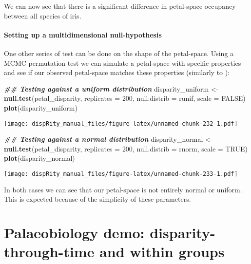 \documentclass[
]{book}
\newenvironment{Shaded}{\begin{snugshade}}{\end{snugshade}}
\newcommand{\AttributeTok}[1]{\textcolor[rgb]{0.13,0.29,0.53}{#1}}
\newcommand{\ConstantTok}[1]{\textcolor[rgb]{0.56,0.35,0.01}{#1}}
\newcommand{\DecValTok}[1]{\textcolor[rgb]{0.00,0.00,0.81}{#1}}
\newcommand{\DocumentationTok}[1]{\textcolor[rgb]{0.56,0.35,0.01}{\textbf{\textit{#1}}}}
\newcommand{\FunctionTok}[1]{\textcolor[rgb]{0.13,0.29,0.53}{\textbf{#1}}}
\newcommand{\NormalTok}[1]{#1}
\newcommand{\OtherTok}[1]{\textcolor[rgb]{0.56,0.35,0.01}{#1}}
\begin{document}
We can now see that there is a significant difference in petal-space occupancy between all species of iris.

\hypertarget{setting-up-a-multidimensional-null-hypothesis}{%
\subsubsection{Setting up a multidimensional null-hypothesis}\label{setting-up-a-multidimensional-null-hypothesis}}

One other series of test can be done on the shape of the petal-space.
Using a MCMC permutation test we can simulate a petal-space with specific properties and see if our observed petal-space matches these properties (similarly to \citet{diaz2016global}):

\begin{Shaded}
\begin{Highlighting}[]
\DocumentationTok{\#\# Testing against a uniform distribution}
\NormalTok{disparity\_uniform }\OtherTok{\textless{}{-}} \FunctionTok{null.test}\NormalTok{(petal\_disparity, }\AttributeTok{replicates =} \DecValTok{200}\NormalTok{,}
    \AttributeTok{null.distrib =}\NormalTok{ runif, }\AttributeTok{scale =} \ConstantTok{FALSE}\NormalTok{)}
\FunctionTok{plot}\NormalTok{(disparity\_uniform)}
\end{Highlighting}
\end{Shaded}

\texttt{[image: dispRity\_manual\_files/figure-latex/unnamed-chunk-232-1.pdf]}

\begin{Shaded}
\begin{Highlighting}[]
\DocumentationTok{\#\# Testing against a normal distribution}
\NormalTok{disparity\_normal }\OtherTok{\textless{}{-}} \FunctionTok{null.test}\NormalTok{(petal\_disparity, }\AttributeTok{replicates =} \DecValTok{200}\NormalTok{,}
    \AttributeTok{null.distrib =}\NormalTok{ rnorm, }\AttributeTok{scale =} \ConstantTok{TRUE}\NormalTok{)}
\FunctionTok{plot}\NormalTok{(disparity\_normal)}
\end{Highlighting}
\end{Shaded}

\texttt{[image: dispRity\_manual\_files/figure-latex/unnamed-chunk-233-1.pdf]}

In both cases we can see that our petal-space is not entirely normal or uniform.
This is expected because of the simplicity of these parameters.

\hypertarget{palaeobiology-demo-disparity-through-time-and-within-groups}{%
\chapter{Palaeobiology demo: disparity-through-time and within groups}\label{palaeobiology-demo-disparity-through-time-and-within-groups}}
\end{document}

